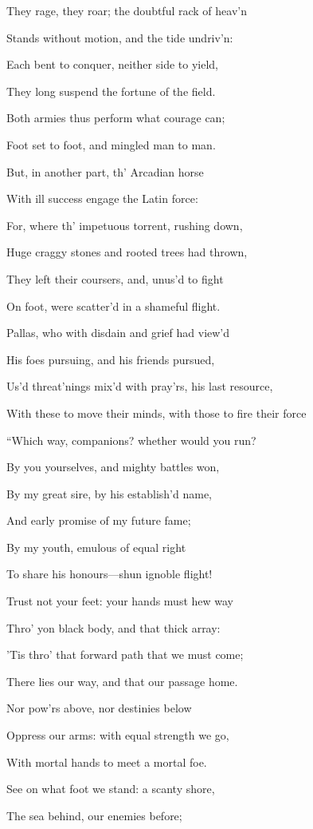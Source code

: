They rage, they roar; the doubtful rack of heav’n

Stands without motion, and the tide undriv’n:

Each bent to conquer, neither side to yield,

They long suspend the fortune of the field.

Both armies thus perform what courage can;

Foot set to foot, and mingled man to man.

But, in another part, th’ Arcadian horse

With ill success engage the Latin force:

For, where th’ impetuous torrent, rushing down,

Huge craggy stones and rooted trees had thrown,

They left their coursers, and, unus’d to fight

On foot, were scatter’d in a shameful flight.

Pallas, who with disdain and grief had view’d

His foes pursuing, and his friends pursued,

Us’d threat’nings mix’d with pray’rs, his last resource,

With these to move their minds, with those to fire their force

“Which way, companions? whether would you run?

By you yourselves, and mighty battles won,

By my great sire, by his establish’d name,

And early promise of my future fame;

By my youth, emulous of equal right

To share his honours—shun ignoble flight!

Trust not your feet: your hands must hew way

Thro’ yon black body, and that thick array:

’Tis thro’ that forward path that we must come;

There lies our way, and that our passage home.

Nor pow’rs above, nor destinies below

Oppress our arms: with equal strength we go,

With mortal hands to meet a mortal foe.

See on what foot we stand: a scanty shore,

The sea behind, our enemies before;

